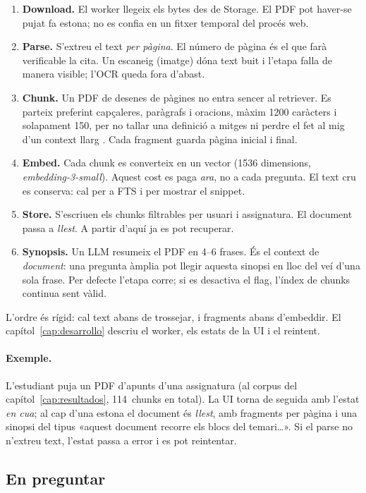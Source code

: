 \begin{enumerate}
  \item \textbf{Download.} El worker llegeix els bytes des de Storage. El PDF pot haver-se pujat fa estona; no es confia en un fitxer temporal del procés web.
  \item \textbf{Parse.} S'extreu el text \emph{per pàgina}. El número de pàgina és el que farà verificable la cita. Un escaneig (imatge) dóna text buit i l'etapa falla de manera visible; l'OCR queda fora d'abast.
  \item \textbf{Chunk.} Un PDF de desenes de pàgines no entra sencer al retriever. Es parteix preferint capçaleres, paràgrafs i oracions, màxim 1200 caràcters i solapament 150, per no tallar una definició a mitges ni perdre el fet al mig d'un context llarg \parencite{liu2024lost,barnett2024seven}. Cada fragment guarda pàgina inicial i final.
  \item \textbf{Embed.} Cada chunk es converteix en un vector (1536 dimensions, \emph{embedding-3-small}). Aquest cost es paga \emph{ara}, no a cada pregunta. El text cru es conserva: cal per a FTS i per mostrar el snippet.
  \item \textbf{Store.} S'escriuen els chunks filtrables per usuari i assignatura. El document passa a \emph{llest}. A partir d'aquí ja es pot recuperar.
  \item \textbf{Synopsis.} Un LLM resumeix el PDF en 4--6 frases. És el context de \emph{document}: una pregunta àmplia pot llegir aquesta sinopsi en lloc del veí d'una sola frase. Per defecte l'etapa corre; si es desactiva el flag, l'índex de chunks continua sent vàlid.
\end{enumerate}

L'ordre és rígid: cal text abans de trossejar, i fragments abans d'embeddir. El capítol~\ref{cap:desarrollo} descriu el worker, els estats de la UI i el reintent.

\paragraph{Exemple.}
L'estudiant puja un PDF d'apunts d'una assignatura (al corpus del capítol~\ref{cap:resultados}, 114~chunks en total). La UI torna de seguida amb l'estat \emph{en cua}; al cap d'una estona el document és \emph{llest}, amb fragments per pàgina i una sinopsi del tipus «aquest document recorre els blocs del temari\ldots». Si el parse no n'extreu text, l'estat passa a error i es pot reintentar.

\subsection{En preguntar}
\label{sec:rag-pregunta}

